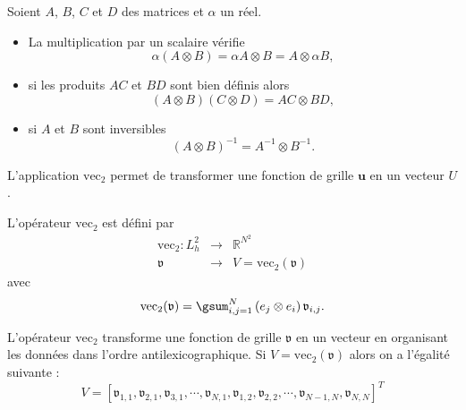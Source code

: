 \begin{proposition}
Soient $A$, $B$, $C$ et $D$ des matrices et $\alpha$ un réel.
\begin{itemize}
\item La multiplication par un scalaire vérifie
\begin{equation}
\alpha ( A \otimes B ) = \alpha A \otimes B = A \otimes \alpha B,
\end{equation}

\item si les produits $AC$ et $BD$ sont bien définis alors
\begin{equation}
(A \otimes B ) (C \otimes D) = AC \otimes BD,
\end{equation} 


\item si $A$ et $B$ sont inversibles
\begin{equation}
(A \otimes B)^{-1} = A^{-1} \otimes B^{-1}.
\end{equation}
\end{itemize}
\label{prop:pdt_kron}
\end{proposition}
L'application $\text{vec}_2$ permet de transformer une fonction de grille $\mathbf{u}$ en un vecteur $U$.

\begin{definition}
L'opérateur $\text{vec}_2$ est défini par
\begin{equation}
\begin{array}{rcl}
\text{vec}_2 : L^2_h & \longrightarrow & \mathbb{R}^{N^2}\\
\mathfrak{v} & \longrightarrow & V = \text{vec}_2(\mathfrak{v})
\end{array}
\end{equation}
avec
\begin{equation}
\text{vec}_2(\mathfrak{v}) = \gsum_{i,j=1}^N \left( e_j \otimes e_i \right)\mathfrak{v}_{i,j}.
\end{equation}
\end{definition}

L'opérateur $\text{vec}_2$ transforme une fonction de grille $\mathfrak{v}$ en un vecteur en organisant les données dans l'ordre antilexicographique. Si $V = \text{vec}_2 (\mathfrak{v})$ alors on a l'égalité suivante :
\begin{equation}
V=[\mathfrak{v}_{1,1}, \mathfrak{v}_{2,1}, \mathfrak{v}_{3,1}, \cdots, \mathfrak{v}_{N,1}, \mathfrak{v}_{1,2}, \mathfrak{v}_{2,2}, \cdots,  \mathfrak{v}_{N-1,N}, \mathfrak{v}_{N,N}]^T
\end{equation}

